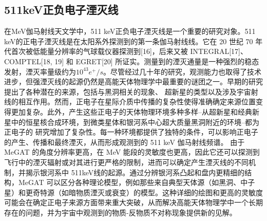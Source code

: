 \subsection{511keV正负电子湮灭线}
\label{subsec:511keV}
在MeV伽马射线天文学中，511 keV正负电子湮灭线是一个重要的研究对象。511 keV的正电子湮灭线是在太阳系外探测到的第一条伽马射线线。它在 20 世纪 70 年代首次被低能量分辨率的气球载仪器探测到[16]，后来又被 INTEGRAL[17]、COMPTEL[18, 19]
和 EGRET[20] 所证实。测量到的湮灭通量是一种强烈的稳态发射，湮灭率量级约为$ 10^{43}e^+ /s $。尽管经过几十年的研究，观测能力也取得了技术进步，但强湮灭线的起源仍然是高能天体物理学中最重要的谜团之一。早期的研究提出了各种潜在的来源，包括与黑洞相关的现象、
超新星的类型以及涉及宇宙射线的相互作用。然而，正电子在星际介质中传播的复杂性使得准确确定来源位置变得更加复杂。此外，产生这些正电子的天体物理环境多种多样--从超新星和经典新星中的恒星核合成环境，到微类星体和银河系中心超大质量黑洞附近的环境--都为正电子的
研究增加了复杂性。每一种环境都提供了独特的条件，可以影响正电子的产生、传播和最终湮灭，从而形成观测到的 511 keV 伽马射线频谱。
由于 MeGAT 的角度分辨率更高，在 MeV 能段的灵敏度也更高，因此它还可以探测到飞行中的湮灭辐射或对其进行更严格的限制，进而可以确定产生湮灭线的不同机制，并揭示银河系中 511keV线的起源。通过分辨银河系凸起和盘内更精细的结构，MeGAT
可以区分各种理论模型，例如那些来自典型天体源（如黑洞、中子星）和更奇特源（如暗物质湮灭或衰变）的模型。这种详细的绘图和更高的灵敏度可能会在确定正电子来源方面带来重大突破，从而解决高能天体物理学中一个长期存在的问题，并为宇宙中观测到的物质-反物质不对称现象提供新的见解。

